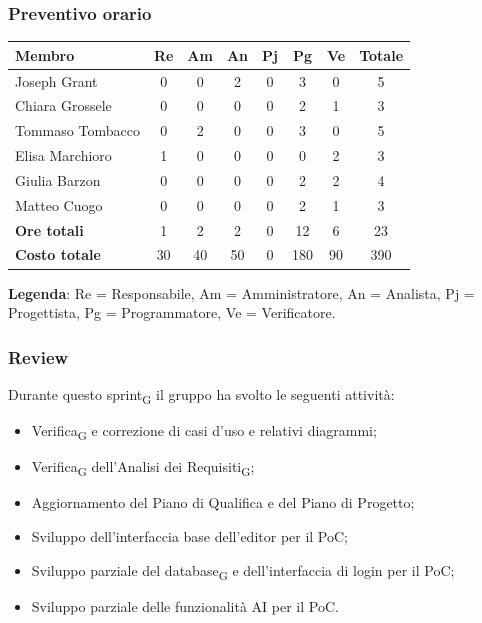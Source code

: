 \documentclass[11pt,a4paper]{article}
\newcommand{\gls}[1]{#1\textsubscript{G}}
\begin{document}
\subsubsection{Preventivo orario}
\begin{center}
    \begin{tabular}{|l|c|c|c|c|c|c|c|}
        \hline
        \textbf{Membro} & \textbf{Re} & \textbf{Am} & \textbf{An} & \textbf{Pj} & \textbf{Pg} & \textbf{Ve} & \textbf{Totale} \\
        \hline
        Joseph Grant & 0 & 0 & 2 & 0 & 3 & 0 & 5 \\
        \hline
        Chiara Grossele & 0 & 0 & 0 & 0 & 2 & 1 & 3 \\
        \hline
        Tommaso Tombacco & 0 & 2 & 0 & 0 & 3 & 0 & 5 \\
        \hline
        Elisa Marchioro & 1 & 0 & 0 & 0 & 0 & 2 & 3 \\
        \hline
        Giulia Barzon & 0 & 0 & 0 & 0 & 2 & 2 & 4 \\
        \hline
        Matteo Cuogo & 0 & 0 & 0 & 0 & 2 & 1 & 3 \\
        \hline
        \textbf{Ore totali} & 1 & 2 & 2 & 0 & 12 & 6 & 23 \\
        \hline
        \textbf{Costo totale} & 30 & 40 & 50 & 0 & 180 & 90 & 390 \\
        \hline
    \end{tabular}
\end{center}

\noindent \textbf{Legenda}: Re = Responsabile, Am = Amministratore, An = Analista, Pj = Progettista, Pg = Programmatore, Ve = Verificatore.

\subsubsection{Review}
Durante questo \gls{sprint} il gruppo ha svolto le seguenti attività:
\begin{itemize}
    \item \gls{Verifica} e correzione di casi d'uso e relativi diagrammi;
    \item \gls{Verifica} dell'\gls{Analisi dei Requisiti};
    \item Aggiornamento del Piano di Qualifica e del Piano di Progetto;
    \item Sviluppo dell'interfaccia base dell'editor per il PoC;
    \item Sviluppo parziale del \gls{database} e dell'interfaccia di login per il PoC;
    \item Sviluppo parziale delle funzionalità AI per il PoC.
\end{itemize}
\end{document}
